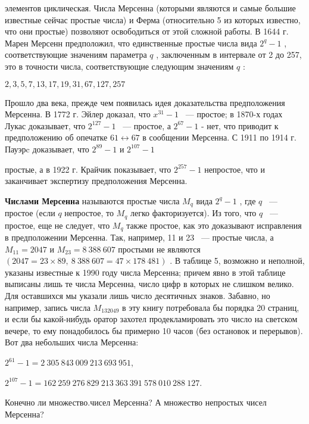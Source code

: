 \documentclass{mai_book}
\begin{document}
элементов циклическая. Числа Мерсенна (которыми являются и самые 
большие известные сейчас простые числа) и Ферма (относительно 5 из 
которых известно, что они простые) позволяют освободиться от этой 
сложной работы. 
В 1644 г. Марен Мерсенн предположил, что единственные простые 
числа вида $2^q-1$
, соответствующие значениям параметра $q$
,  
заключенным в интервале от 2 до 257, это в точности числа, соответствующие 
следующим значениям $q$
:

\begin{center}
$2,3,5,7,13,17,19,31,67,127,257$
\end{center}

Прошло два века, прежде чем появилась идея доказательства  
предположения Мерсенна. В 1772 г. Эйлер доказал, что $x^{31} - 1$
 ~— простое; в 
1870-х годах Лукас доказывает, что $2^{127}-1$
 ~— простое, а $2^{67}-1$
 - 
нет, что приводит к предположению об опечатке $61\leftrightarrow 67$
 в сообщении 
Мерсенна. С 1911 по 1914 г. Пауэрc доказывает, что $2^{89}-1$
 и $2^{107}-1$
 
простые, а в 1922 г. Крайчик показывает, что $2^{257}-1$
 непростое, что 
и заканчивает экспертизу предположения Мерсенна. 

{\bf Числами Мерсенна} называются простые числа $M_q$
 вида $2^q-1$
 , 
где $q$
 ~— простое (если $q$
 непростое, то $M_q$
 легко факторизуется). Из 
того, что $q$
 ~— простое, еще не следует, что $M_q$
 также простое, как это 
доказывают исправления в предположении Мерсенна. Так, например, 
11 и 23 ~— простые числа, а $M_{11}=2047$
 и $M_{23}=8\ 388\ 607$
 простыми не 
являются $(2047=23\times 89,\ 8\ 388\ 607=47\times 178\ 481)$
. 
В таблице 5, возможно и неполной, указаны известные к 1990 году 
числа Мерсенна; причем явно в этой таблице выписаны лишь те числа 
Мерсенна, число цифр в которых не слишком велико. Для оставшихся 
мы указали лишь число десятичных знаков. Забавно, но например,  
запись числа $M_{132049}$
 в эту книгу потребовала бы порядка 20 страниц, 
и если бы какой-нибудь оратор захотел продекламировать это число 
на светском вечере, то ему понадобилось бы примерно 10 часов (без 
остановок и перерывов). Вот два небольших числа Мерсенна:

\begin{center}
$2^{61}-1 = 2\ 305\ 843\ 009\ 213\ 693\ 951$,

$2^{107}-1= 162\ 259\ 276\ 829\ 213\ 363\ 391\ 578\ 010\ 288\ 127$.
\end{center}


Конечно ли множество.чисел Мерсенна? А множество непростых чисел 
Мерсенна?
\end{document}
